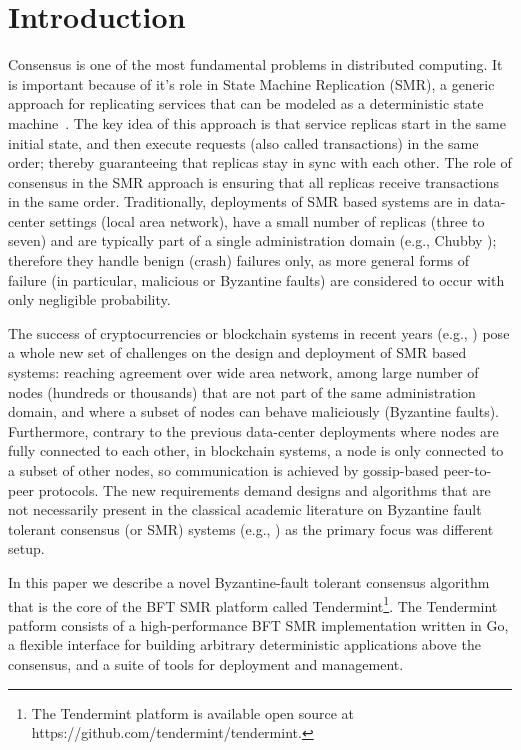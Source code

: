 \section{Introduction} \label{sec:tendermint}

Consensus is one of the most fundamental problems in distributed computing. It
is important because of it's role in State Machine Replication (SMR), a generic
approach for replicating services that can be modeled as a deterministic state
machine~\cite{Lam78:cacm, Sch90:survey}. The key idea of this approach is that
service replicas start in the same initial state, and then execute requests
(also called transactions) in the same order; thereby guaranteeing that
replicas stay in sync with each other. The role of consensus in the SMR
approach is ensuring that all replicas receive transactions in the same order.
Traditionally, deployments of SMR based systems are in data-center settings
(local area network), have a small number of replicas (three to seven) and are
typically part of a single administration domain (e.g., Chubby
\cite{Bur:osdi06}); therefore they handle benign (crash) failures only, as more
general forms of failure (in particular, malicious or Byzantine faults) are
considered to occur with only negligible probability.  

The success of cryptocurrencies or blockchain systems in recent years (e.g.,
\cite{Nak2012:bitcoin, But2014:ethereum}) pose a whole new set of challenges on
the design and deployment of SMR based systems: reaching agreement over wide
area network, among large number of nodes (hundreds or thousands) that are not
part of the same administration domain, and where a subset of nodes can behave
maliciously (Byzantine faults). Furthermore, contrary to the previous
data-center deployments where nodes are fully connected to each other, in
blockchain systems, a node is only connected to a subset of other nodes, so
communication is achieved by gossip-based peer-to-peer protocols. 
The new requirements demand designs and algorithms that are not necessarily
present in the classical academic literature on Byzantine fault tolerant
consensus (or SMR) systems (e.g., \cite{DLS88:jacm, CL02:tcs}) as the primary 
focus was different setup. 

In this paper we describe a novel Byzantine-fault tolerant consensus algorithm
that is the core of the BFT SMR platform called Tendermint\footnote{The
	Tendermint platform is available open source at
	https://github.com/tendermint/tendermint.}. The Tendermint patform consists of
a high-performance BFT SMR implementation written in Go, a flexible interface
for
building arbitrary deterministic applications above the consensus, and a suite
of tools for deployment and management.  

